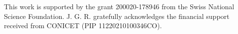 \documentclass[draft]{agujournal2019}
\begin{document}
%





\acknowledgments
This work is supported by the grant 200020-178946 from the Swiss National Science Foundation. J. G. R. gratefully acknowledges the financial support received from CONICET (PIP 11220210100346CO).




%
%







%
%
%
%
%
\end{document}
